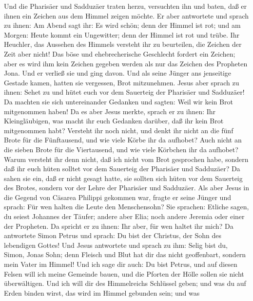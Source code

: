 Und die Pharisäer und Sadduzäer traten herzu, versuchten
ihn und baten, daß er ihnen ein Zeichen aus dem Himmel zeigen möchte.
 Er aber antwortete und sprach zu ihnen: Am Abend sagt
ihr: Es wird schön; denn der Himmel ist rot;  und am
Morgen: Heute kommt ein Ungewitter; denn der Himmel ist rot und trübe.
Ihr Heuchler, das Aussehen des Himmels versteht ihr zu beurteilen, die
Zeichen der Zeit aber nicht!  Das böse und ehebrecherische
Geschlecht fordert ein Zeichen; aber es wird ihm kein Zeichen gegeben
werden als nur das Zeichen des Propheten Jona. Und er verließ sie und
ging davon.  Und als seine Jünger ans jenseitige Gestade
kamen, hatten sie vergessen, Brot mitzunehmen.  Jesus aber
sprach zu ihnen: Sehet zu und hütet euch vor dem Sauerteig der Pharisäer
und Sadduzäer!  Da machten sie sich untereinander Gedanken
und sagten: Weil wir kein Brot mitgenommen haben!  Da es
aber Jesus merkte, sprach er zu ihnen: Ihr Kleingläubigen, was macht ihr
euch Gedanken darüber, daß ihr kein Brot mitgenommen habt?
 Versteht ihr noch nicht, und denkt ihr nicht an die fünf
Brote für die Fünftausend, und wie viele Körbe ihr da aufhobet?
 Auch nicht an die sieben Brote für die Viertausend, und
wie viele Körbchen ihr da aufhobet?  Warum versteht ihr
denn nicht, daß ich nicht vom Brot gesprochen habe, sondern daß ihr euch
hüten solltet vor dem Sauerteig der Pharisäer und Sadduzäer?
 Da sahen sie ein, daß er nicht gesagt hatte, sie sollten
sich hüten vor dem Sauerteig des Brotes, sondern vor der Lehre der
Pharisäer und Sadduzäer.  Als aber Jesus in die Gegend
von Cäsarea Philippi gekommen war, fragte er seine Jünger und sprach:
Für wen halten die Leute den Menschensohn?  Sie sprachen:
Etliche sagen, du seiest Johannes der Täufer; andere aber Elia; noch
andere Jeremia oder einer der Propheten.  Da spricht er
zu ihnen: Ihr aber, für wen haltet ihr mich?  Da
antwortete Simon Petrus und sprach: Du bist der Christus, der Sohn des
lebendigen Gottes!  Und Jesus antwortete und sprach zu
ihm: Selig bist du, Simon, Jonas Sohn; denn Fleisch und Blut hat dir das
nicht geoffenbart, sondern mein Vater im Himmel!  Und ich
sage dir auch: Du bist Petrus, und auf diesen Felsen will ich meine
Gemeinde bauen, und die Pforten der Hölle sollen sie nicht überwältigen.
 Und ich will dir des Himmelreichs Schlüssel geben; und
was du auf Erden binden wirst, das wird im Himmel gebunden sein; und was
